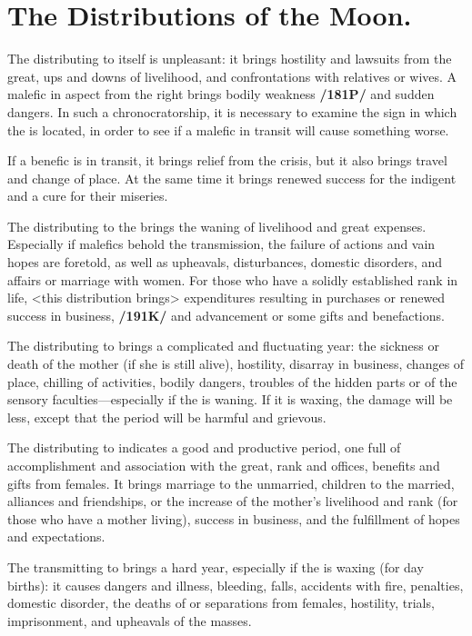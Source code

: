 \section{The Distributions of the Moon.}

The \Moon\xspace distributing to itself is unpleasant: it brings hostility and lawsuits from the great, ups and downs of livelihood, and confrontations with relatives or wives. A malefic in aspect from the right brings bodily weakness \textbf{/181P/} and sudden dangers. In such a chronocratorship, it is necessary to examine the sign in which the \Moon\xspace is located, in order to see if a malefic in transit will cause something worse. 

If a benefic is in transit, it brings relief from the crisis, but it also brings travel and change of place. At the same time it brings renewed success for the indigent and a cure for their miseries.

The \Moon\xspace distributing to the \Sun\xspace brings the waning of livelihood and great expenses. Especially if malefics behold the transmission, the failure of actions and vain hopes are foretold, as well as upheavals, disturbances, domestic disorders, and affairs or marriage with women. For those who have a solidly established rank in life, <this distribution brings> expenditures resulting in purchases or renewed success in business, \textbf{/191K/} and advancement or some gifts and benefactions.

The \Moon\xspace distributing to \Saturn\xspace brings a complicated and fluctuating year: the sickness or death of the
mother (if she is still alive), hostility, disarray in business, changes of place, chilling of activities, bodily
dangers, troubles of the hidden parts or of the sensory faculties—especially if the \Moon\xspace is waning. If it is
waxing, the damage will be less, except that the period will be harmful and grievous.

The \Moon\xspace distributing to \Jupiter\xspace indicates a good and productive period, one full of accomplishment and association with the great, rank and offices, benefits and gifts from females. It brings marriage to the unmarried, children to the married, alliances and friendships, or the increase of the mother’s livelihood and rank (for those who have a mother living), success in business, and the fulfillment of hopes and expectations.

The \Moon\xspace transmitting to \Mars\xspace brings a hard year, especially if the \Moon\xspace is waxing (for day births): it causes dangers and illness, bleeding, falls, accidents with fire, penalties, domestic disorder, the deaths of or separations from females, hostility, trials, imprisonment, and upheavals of the masses. 

